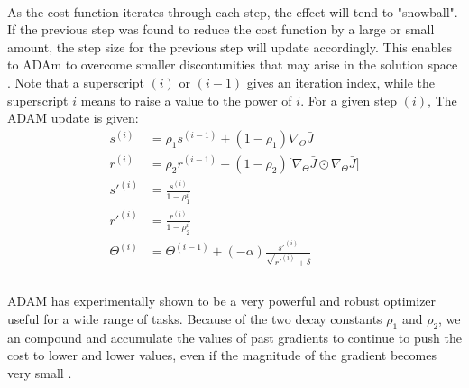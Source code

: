 \documentclass[12pt,letterpaper]{article}
\begin{document}
\paragraph*{}As the cost function iterates through each step, the effect will tend to "snowball". If the previous step was found to reduce the cost function by a large or small amount, the step size for the previous step will update accordingly. This enables to ADAm to overcome smaller discontunities that may arise in the solution space \cite{Goodfellow}. Note that a superscript $(i)$ or $(i-1)$ gives an iteration index, while the superscript $i$ means to raise a value to the power of $i$. For a given step $(i)$, The ADAM update is given:
\begin{equation}
\label{eqn-ADAMupdate}
\begin{split}
s^{(i)} &= \rho_1 s^{(i-1)} + (1 - \rho_1) \nabla_{\Theta} \bar{J}  \\
r^{(i)} &= \rho_2 r^{(i-1)} + (1 - \rho_2) \Big[ \nabla_{\Theta} \bar{J} \odot \nabla_{\Theta} \bar{J} \Big]  \\
s'^{(i)} &= \frac{s^{(i)}}{1-\rho_1^i} \\
r'^{(i)} &= \frac{r^{(i)}}{1-\rho_2^i} \\
\Theta^{(i)} &= \Theta^{(i-1)} + (-\alpha)\frac{s'^{(i)}}{\sqrt{r'^{(i)}}+\delta} \\
\end{split}
\end{equation}

\paragraph*{}ADAM has experimentally shown to be a very powerful and robust optimizer useful for a wide range of tasks. Because of the two decay constants $\rho_1$ and $\rho_2$, we an compound and accumulate the values of past gradients to continue to push the cost to lower and lower values, even if the magnitude of the gradient becomes very small \cite{Geron}. 
\end{document}
